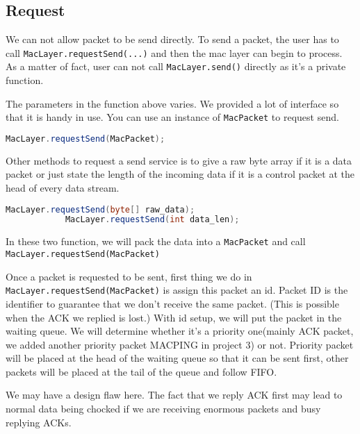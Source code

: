 \documentclass[conference,compsoc]{IEEEtran}
\begin{document}
	\subsection{Request}
		We can not allow packet to be send directly. To send a packet, the user has to call \lstinline{MacLayer.requestSend(...)} and then the mac layer can begin to process. 
		As a matter of fact, user can not call \lstinline{MacLayer.send()} directly as it's a private function.
		\par
		The parameters in the function above varies. We provided a lot of interface so that it is handy in use. You can use an instance of \lstinline{MacPacket} to request send. 
		\begin{lstlisting}[linewidth=\columnwidth,language=Java]
			MacLayer.requestSend(MacPacket);
		\end{lstlisting}
		\par
		Other methods to request a send service is to give a raw byte array if it is a data packet or just state the length of the incoming data if it is a control packet at the head of every data stream.
		\begin{lstlisting}[linewidth=\columnwidth,language=Java]
			MacLayer.requestSend(byte[] raw_data);
			MacLayer.requestSend(int data_len);
		\end{lstlisting}
		In these two function, we will pack the data into a \lstinline{MacPacket} and call \lstinline{MacLayer.requestSend(MacPacket)}
		\par
		Once a packet is requested to be sent, first thing we do in \lstinline{MacLayer.requestSend(MacPacket)} is assign this packet an id. 
		Packet ID is the identifier to guarantee that we don't receive the same packet.
		(This is possible when the ACK we replied is lost.)
		With id setup, we will put the packet in the waiting queue. We will determine whether it's a priority one(mainly ACK packet, we added another priority packet MACPING in project 3) or not. 
		Priority packet will be placed at the head of the waiting queue so that it can be sent first, other packets will be placed at the tail of the queue and follow FIFO. 
		\par
		We may have a design flaw here. 
		The fact that we reply ACK first may lead to normal data being chocked if we are receiving enormous packets and busy replying ACKs.
\end{document}
